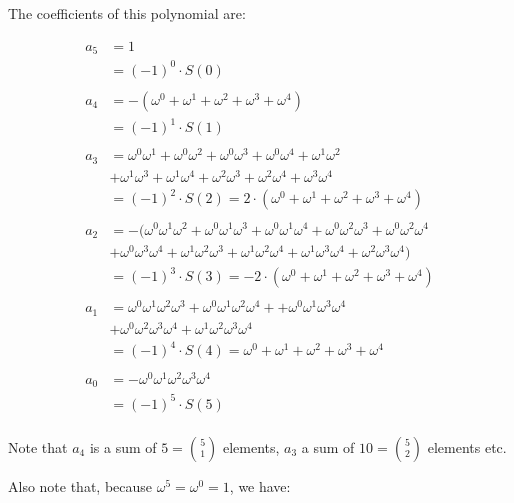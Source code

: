 \documentclass[a4paper]{article}
\begin{document}
The coefficients of this polynomial are:

\begin{equation}
  \begin{aligned}
    a_5 &= 1 \\
        &= (-1)^{0} \cdot S(0) \\
    \\
    a_4 &= -(\omega^0 + \omega^1 + \omega^2 + \omega^3 + \omega^4) \\
        &= (-1)^{1} \cdot S(1) \\
    \\
    a_3 &= \omega^0\omega^1 + \omega^0\omega^2 + \omega^0\omega^3 + \omega^0\omega^4 + \omega^1\omega^2 \\
        &  + \omega^1\omega^3 + \omega^1\omega^4 + \omega^2\omega^3 + \omega^2\omega^4 + \omega^3\omega^4 \\
        &= (-1)^{2} \cdot S(2) = 2 \cdot (\omega^0 + \omega^1 + \omega^2 + \omega^3 + \omega^4)\\
    \\
    a_2 &= -(\omega^0\omega^1\omega^2 + \omega^0\omega^1\omega^3 + \omega^0\omega^1\omega^4 + \omega^0\omega^2\omega^3 +\omega^0\omega^2\omega^4\\
        &+ \omega^0\omega^3\omega^4 + \omega^1\omega^2\omega^3 + \omega^1\omega^2\omega^4 +\omega^1\omega^3\omega^4 +\omega^2\omega^3\omega^4) \\
        &= (-1)^{3} \cdot S(3) = -2 \cdot (\omega^0 + \omega^1 + \omega^2 + \omega^3 + \omega^4)\\
    \\
    a_1 &= \omega^0\omega^1\omega^2\omega^3 + \omega^0\omega^1\omega^2\omega^4 + + \omega^0\omega^1\omega^3\omega^4 \\
        &+ \omega^0\omega^2\omega^3\omega^4 + \omega^1\omega^2\omega^3\omega^4 \\
        &= (-1)^{4} \cdot S(4) = \omega^0 + \omega^1 + \omega^2 + \omega^3 + \omega^4 \\
    \\
    a_0 &= - \omega^0\omega^1\omega^2\omega^3\omega^4 \\
        &= (-1)^{5} \cdot S(5) \\
  \end{aligned}
\end{equation}

Note that $a_4$ is a sum of $5 = \binom{5}{1}$ elements, $a_3$ a sum of $10 = \binom{5}{2}$ elements etc.

Also note that, because $\omega^5 = \omega^0 = 1$, we have:
\end{document}
